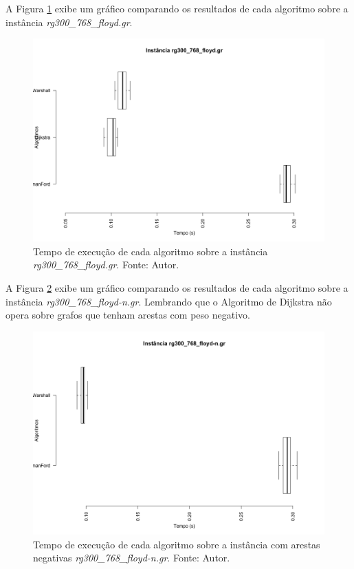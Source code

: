 \documentclass[12pt]{article}
\begin{document}
A Figura \ref{fig:rg300_768_floyd} exibe um gráfico comparando os resultados de cada algoritmo sobre a instância \textit{ rg300\_768\_floyd.gr}.

\begin{figure}[H]
  \centering
    \includegraphics[width=1\textwidth]{img/rg300_768_floyd.png}
  \caption{Tempo de execução de cada algoritmo sobre a instância \textit{rg300\_768\_floyd.gr}. Fonte: Autor.}
  \label{fig:rg300_768_floyd}
\end{figure}


A Figura \ref{fig:rg300_768_floyd_n} exibe um gráfico comparando os resultados de cada algoritmo sobre a instância \textit{ rg300\_768\_floyd-n.gr}. Lembrando que o Algoritmo de Dijkstra não opera sobre grafos que tenham arestas com peso negativo.

\begin{figure}[H]
  \centering
    \includegraphics[width=1\textwidth]{img/rg300_768_floyd-n_gr.png}
  \caption{Tempo de execução de cada algoritmo sobre a instância com arestas negativas \textit{rg300\_768\_floyd-n.gr}. Fonte: Autor.}
  \label{fig:rg300_768_floyd_n}
\end{figure}
\end{document}
